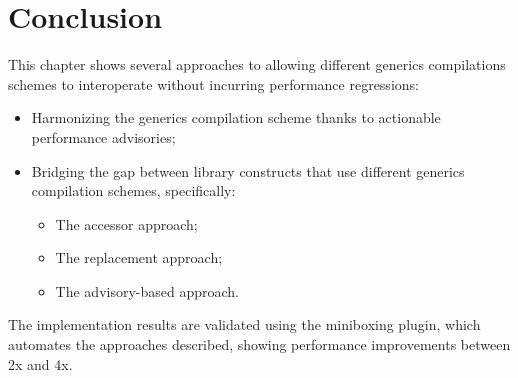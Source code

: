 \vspace{-1em}

\section{Conclusion}

This chapter shows several approaches to allowing different generics compilations schemes to interoperate without incurring performance regressions:

\begin{itemize}
\item Harmonizing the generics compilation scheme thanks to actionable performance advisories;
\item Bridging the gap between library constructs that use different generics compilation schemes, specifically:
  \begin{itemize}
    \item The accessor approach;
    \item The replacement approach;
    \item The advisory-based approach.
  \end{itemize}
\end{itemize}

The implementation results are validated using the miniboxing plugin, which automates the approaches described, showing performance improvements between 2x and 4x.


